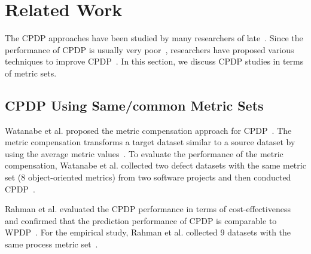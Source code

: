 \section{Related Work}
\label{sec:Background}
The CPDP approaches have been studied by many researchers
of late~\cite{Canfora13,Ma12,Nam13,Panichella14,Rahman12,Ryu14,Ryu15,Turhan09,Zhang15,Zimmermann09}. Since the performance
of CPDP is usually very poor~\cite{Zimmermann09}, researchers have proposed various techniques to
improve CPDP~\cite{Canfora13,Ma12,Nam13,Panichella14,Ryu14,Ryu15,Turhan09,Watanabe08}. In this section, we discuss CPDP studies in terms of metric sets.

  
\subsection{CPDP Using Same/common Metric Sets}
Watanabe et al. proposed the metric compensation approach for
CPDP~\cite{Watanabe08}. The metric compensation transforms a target dataset
similar to a source dataset by using the average metric
values~\cite{Watanabe08}.
To evaluate the performance of the metric compensation, Watanabe et al. collected
two defect datasets with the same metric set (8 object-oriented
metrics) from two software projects and then conducted
CPDP~\cite{Watanabe08}.

Rahman et al. evaluated the CPDP performance in terms of
cost-effectiveness and confirmed that the prediction performance of CPDP is
comparable to WPDP~\cite{Rahman12}. For the empirical study, Rahman et al.
collected 9 datasets with the same process metric set~\cite{Rahman12}.

